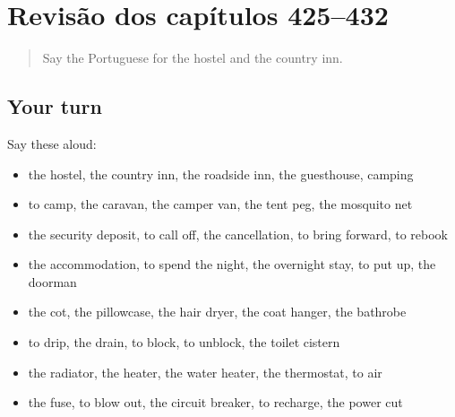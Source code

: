 \section[(dialogue)]{Revisão dos capítulos 425–432}

\label{lesson:PT-R432-revisao-425-432}



\begin{quote}
Say the Portuguese for the hostel and the country inn.
\end{quote}

\subsection*{Your turn}
Say these aloud:

\begin{itemize}
\raggedright
  \item the hostel, the country inn, the roadside inn, the guesthouse, camping
  \item to camp, the caravan, the camper van, the tent peg, the mosquito net
  \item the security deposit, to call off, the cancellation, to bring forward, to rebook
  \item the accommodation, to spend the night, the overnight stay, to put up, the doorman
  \item the cot, the pillowcase, the hair dryer, the coat hanger, the bathrobe
  \item to drip, the drain, to block, to unblock, the toilet cistern
  \item the radiator, the heater, the water heater, the thermostat, to air
  \item the fuse, to blow out, the circuit breaker, to recharge, the power cut
\end{itemize}

